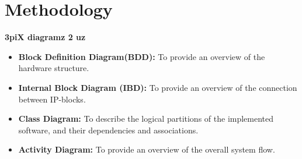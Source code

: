 
\chapter{Methodology}
\textbf{3piX diagramz 2 uz}

\begin{itemize}
	\item\textbf{Block Definition Diagram(BDD):} To provide an overview of the hardware structure.
	
	\item \textbf{Internal Block Diagram (IBD):} To provide an overview of the connection between IP-blocks.
	
	\item \textbf{Class Diagram:} To describe the logical partitions of the implemented software, and their dependencies and associations.
	
	\item \textbf{Activity Diagram:} To provide an overview of the overall system flow.
\end{itemize}